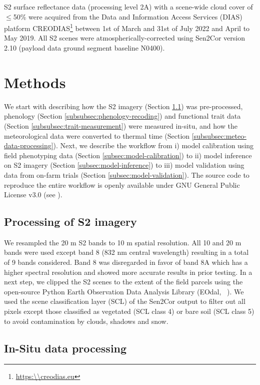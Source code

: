 S2 surface reflectance data (processing level 2A) with a scene-wide cloud cover of $\le$50\% were acquired from the Data and Information Access Services (DIAS) platform CREODIAS\footnote{\url{https:\\creodias.eu}} between 1st of March and 31st of July 2022 and April to May 2019. All S2 scenes were atmospherically-corrected using Sen2Cor version 2.10 (payload data ground segment baseline N0400).

\section{Methods}
\label{sec:methods}
% 
We start with describing how the S2 imagery (Section \ref{subsec:process-s2}) was pre-processed, phenology (Section \ref{subsubsec:phenology-recoding}) and functional trait data (Section \ref{subsubsec:trait-measurement}) were measured in-situ, and how the meteorological data were converted to thermal time (Section \ref{subsubsec:meteo-data-processing}). Next, we describe the workflow from i) model calibration using field phenotyping data (Section \ref{subsec:model-calibration}) to ii) model inference on S2 imagery (Section \ref{subsec:model-inference}) to iii) model validation using data from on-farm trials (Section \ref{subsec:model-validation}). The source code to reproduce the entire workflow is openly available under GNU General Public License v3.0 (see ).

\subsection{Processing of S2 imagery}
\label{subsec:process-s2}
We resampled the 20 m S2 bands to 10 m spatial resolution. All 10 and 20 m bands were used except band 8 (832 nm central wavelength) resulting in a total of 9 bands considered. Band 8 was disregarded in favor of band 8A which has a higher spectral resolution and showed more accurate results in prior testing. In a next step, we clipped the S2 scenes to the extent of the field parcels using the open-source Python Earth Observation Data Analysis Library (EOdal, ~\citet{graf_eodal_2022}). We used the scene classification layer (SCL) of the Sen2Cor output to filter out all pixels except those classified as vegetated (SCL class 4) or bare soil (SCL class 5) to avoid contamination by clouds, shadows and snow.

\subsection{In-Situ data processing}
\label{subsec:in-situ-data-processing}


